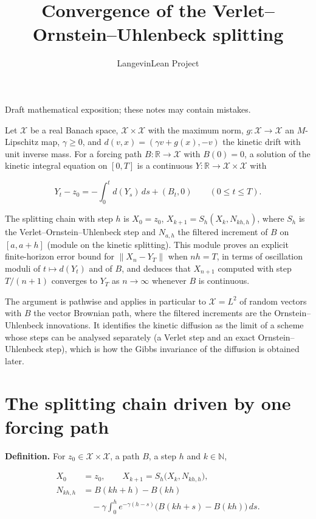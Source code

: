 \documentclass[11pt,a4paper]{article}
\title{\texorpdfstring{Convergence of the Verlet–Ornstein–Uhlenbeck splitting}{Convergence of the Verlet–Ornstein–Uhlenbeck splitting}}
\author{LangevinLean Project}
\date{}
\begin{document}
\maketitle
Draft mathematical exposition; these notes may contain mistakes.


Let \(\mathcal X\) be a real Banach space, \(\mathcal X\times\mathcal X\) with the maximum norm, \(g:\mathcal X\to\mathcal X\) an \(M\)-Lipschitz map, \(\gamma\ge0\), and \(d(v,x)=(\gamma v+g(x),-v)\) the kinetic drift with unit inverse mass. For a forcing path \(B:\mathbb R\to\mathcal X\) with \(B(0)=0\), a solution of the kinetic integral equation on \([0,T]\) is a continuous \(Y:\mathbb R\to\mathcal X\times\mathcal X\) with


\[Y_t-z_0=-\int_0^td(Y_s)\,ds+(B_t,0)\qquad(0\le t\le T).\]


The splitting chain with step \(h\) is \(X_0=z_0\), \(X_{k+1}=S_h(X_k,N_{kh,h})\), where \(S_h\) is the Verlet–Ornstein–Uhlenbeck step and \(N_{a,h}\) the filtered increment of \(B\) on \([a,a+h]\) (module on the kinetic splitting). This module proves an explicit finite-horizon error bound for \(\|X_n-Y_T\|\) when \(nh=T\), in terms of oscillation moduli of \(t\mapsto d(Y_t)\) and of \(B\), and deduces that \(X_{n+1}\) computed with step \(T/(n+1)\) converges to \(Y_T\) as \(n\to\infty\) whenever \(B\) is continuous.




The argument is pathwise and applies in particular to \(\mathcal X=L^2\) of random vectors with \(B\) the vector Brownian path, where the filtered increments are the Ornstein–Uhlenbeck innovations. It identifies the kinetic diffusion as the limit of a scheme whose steps can be analysed separately (a Verlet step and an exact Ornstein–Uhlenbeck step), which is how the Gibbs invariance of the diffusion is obtained later.


\section{\texorpdfstring{The splitting chain driven by one forcing path}{The splitting chain driven by one forcing path}}


\textbf{Definition.} For \(z_0\in\mathcal X\times\mathcal X\), a path \(B\), a step \(h\) and \(k\in\mathbb N\),


\[\begin{aligned}
X_0&=z_0,\qquad X_{k+1}=S_h\bigl(X_k,N_{kh,h}\bigr),\\
N_{kh,h}&=B(kh+h)-B(kh)\\
&\quad-\gamma\int_0^he^{-\gamma(h-s)}\bigl(B(kh+s)-B(kh)\bigr)\,ds.
\end{aligned}\]
\end{document}
